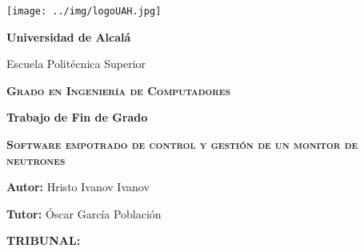 
\enlargethispage{1cm}
\thispagestyle{empty}

\begin{center}
\texttt{[image: ../img/logoUAH.jpg]}
\par\end{center}

\begin{center}
\textbf{\huge Universidad de Alcalá}
\par\end{center}{\huge \par}

\begin{center}
{\Large Escuela Politécnica Superior}
\par\end{center}{\Large \par}

\medskip{}


\begin{center}
\textbf{\textsc{\huge Grado en Ingeniería de Computadores }}
\par\end{center}{\huge \par}

\medskip{}


\begin{center}
\textbf{\Large Trabajo de Fin de Grado}
\par\end{center}{\Large \par}

\begin{center}
\textbf{\textsc{\LARGE 
  Software empotrado de control y gestión de un monitor de neutrones
}}
\par\end{center}{\LARGE \par}

\medskip{}


\begin{center}
\textbf{\large Autor:}{\large{} Hristo Ivanov Ivanov}
\par\end{center}{\large \par}
\begin{center}
\textbf{\large Tutor:}{\large{} Óscar García Población }
\par\end{center}{\large \par}

\vspace{1.0cm}
\textbf{\Large TRIBUNAL:}{\Large \par}

